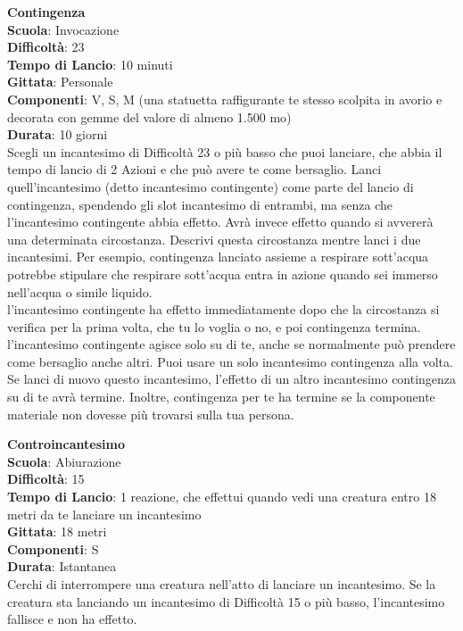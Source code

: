 \begin{multicols}{2}
\medskip\textbf{Contingenza}\\
\textbf{Scuola}: Invocazione\\
\textbf{Difficoltà}:  23\\
\textbf{Tempo di Lancio}: 10 minuti\\
\textbf{Gittata}: Personale\\
\textbf{Componenti}: V, S, M (una statuetta raffigurante te stesso scolpita in avorio e decorata con gemme del valore di almeno 1.500 mo)\\
\textbf{Durata}: 10 giorni\\
Scegli un incantesimo di Difficoltà 23 o più basso che puoi lanciare, che abbia il tempo di lancio di 2 Azioni e che può avere te come bersaglio. Lanci quell'incantesimo (detto incantesimo contingente) come parte del lancio di contingenza, spendendo gli slot incantesimo di entrambi, ma senza che l'incantesimo contingente abbia effetto. Avrà invece effetto quando si avvererà una determinata circostanza. Descrivi questa circostanza mentre lanci i due incantesimi. Per esempio, contingenza lanciato assieme a respirare sott’acqua potrebbe stipulare che respirare sott’acqua entra in azione quando sei immerso nell'acqua o simile liquido.\\
l'incantesimo contingente ha effetto immediatamente dopo che la circostanza si verifica per la prima volta, che tu lo voglia o no, e poi contingenza termina. l'incantesimo contingente agisce solo su di te, anche se normalmente può prendere come bersaglio anche altri. Puoi usare un solo incantesimo contingenza alla volta. Se lanci di nuovo questo incantesimo, l’effetto di un altro incantesimo contingenza su di te avrà termine. Inoltre, contingenza per te ha termine se la componente materiale non dovesse più trovarsi sulla tua persona.


\medskip\textbf{Controincantesimo}\\
\textbf{Scuola}: Abiurazione\\
\textbf{Difficoltà}:  15\\
\textbf{Tempo di Lancio}: 1 reazione, che effettui quando vedi una creatura entro 18 metri da te lanciare un incantesimo\\
\textbf{Gittata}: 18 metri\\
\textbf{Componenti}: S \\
\textbf{Durata}: Istantanea\\
Cerchi di interrompere una creatura nell'atto di lanciare un incantesimo. Se la creatura sta lanciando un incantesimo di Difficoltà 15 o più basso, l'incantesimo fallisce e non ha effetto. 



\end{multicols}
